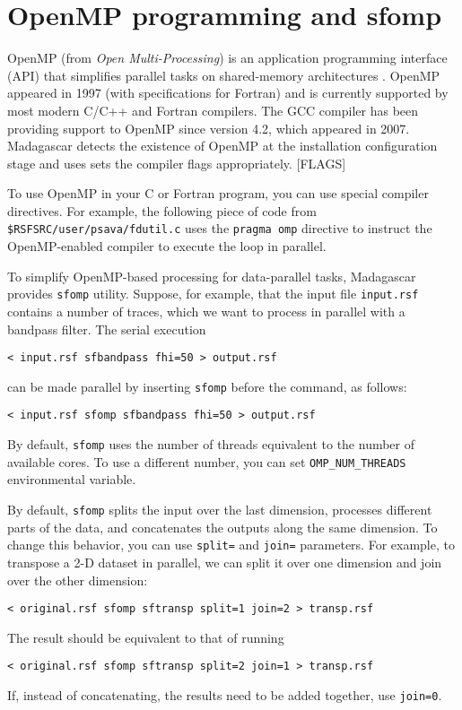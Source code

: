 \section{OpenMP programming and sfomp}

OpenMP (from \emph{Open Multi-Processing}) is an application
programming interface (API) that simplifies parallel tasks on
shared-memory architectures \cite[]{chandra,chapman}. OpenMP appeared
in 1997 (with specifications for Fortran) and is currently supported
by most modern C/C++ and Fortran compilers. The GCC compiler has been
providing support to OpenMP since version 4.2, which appeared in
2007. Madagascar detects the existence of OpenMP at the installation
configuration stage and uses sets the compiler flags appropriately. [FLAGS]

To use OpenMP in your C or Fortran program, you can use special
compiler directives. For example, the following piece of code from
\texttt{\$RSFSRC/user/psava/fdutil.c} uses the \texttt{pragma omp}
directive to instruct the OpenMP-enabled compiler to execute the loop
in parallel.

\lstset{language=c,numbers=left,numberstyle=\tiny,showstringspaces=false}


To simplify OpenMP-based processing for data-parallel tasks,
Madagascar provides \texttt{sfomp} utility. Suppose, for example, that
the input file \texttt{input.rsf} contains a number of traces, which
we want to process in parallel with a bandpass filter. The serial execution
\begin{verbatim}
< input.rsf sfbandpass fhi=50 > output.rsf
\end{verbatim}
can be made parallel by inserting \texttt{sfomp} before the command, as follows:
\begin{verbatim}
< input.rsf sfomp sfbandpass fhi=50 > output.rsf
\end{verbatim}

By default, \texttt{sfomp} uses the number of threads equivalent to
the number of available cores. To use a different number, you can set
\texttt{OMP\_NUM\_THREADS} environmental variable.

By default, \texttt{sfomp} splits the input over the last dimension,
processes different parts of the data, and concatenates the outputs
along the same dimension. To change this behavior, you can use
\texttt{split=} and \texttt{join=} parameters. For example, to
transpose a 2-D dataset in parallel, we can split it over one
dimension and join over the other dimension:
\begin{verbatim}
< original.rsf sfomp sftransp split=1 join=2 > transp.rsf
\end{verbatim}
The result should be equivalent to that of running
\begin{verbatim}
< original.rsf sfomp sftransp split=2 join=1 > transp.rsf
\end{verbatim}
If, instead of concatenating, the results need to be added together,
use \texttt{join=0}.

